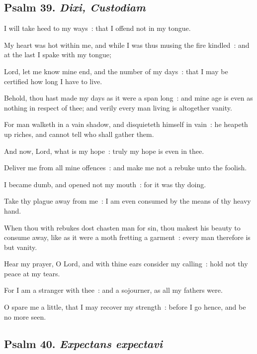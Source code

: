 \subsection{Psalm 39. \textit{Dixi, Custodiam}}

 I will take heed to my ways~: that I offend not in my tongue.\par
{}
My heart was hot within me, and while I was thus musing the fire kindled~: and at the last I spake with my tongue;\par
{}Lord, let me know mine end, and the number of my days~: that I may be certified how long I have to live.\par
{}Behold, thou hast made my days as it were a span long~: and mine age is even as nothing in respect of thee; and verily every man living is altogether vanity.\par
{}For man walketh in a vain shadow, and disquieteth himself in vain~: he heapeth up riches, and cannot tell who shall gather them.\par
{}And now, Lord, what is my hope~: truly my hope is even in thee.\par
{}Deliver me from all mine offences~: and make me not a rebuke unto the foolish.\par
{}I became dumb, and opened not my mouth~: for it was thy doing.\par
{}Take thy plague away from me~: I am even consumed by the means of thy heavy hand.\par
{}When thou with rebukes dost chasten man for sin, thou makest his beauty to consume away, like as it were a moth fretting a garment~: every man therefore is but vanity.\par
{}Hear my prayer, O Lord, and with thine ears consider my calling~: hold not thy peace at my tears.\par
{}For I am a stranger with thee~: and a sojourner, as all my fathers were.\par
{}O spare me a little, that I may recover my strength~: before I go hence, and be no more seen.\par

\clearpage
\subsection{Psalm 40. \textit{Expectans expectavi}}


